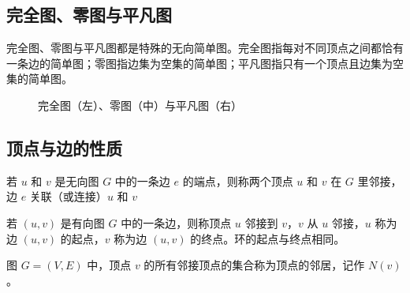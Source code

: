 \subsection{完全图、零图与平凡图}
完全图、零图与平凡图都是特殊的无向简单图。完全图指每对不同顶点之间都恰有一条边的简单图；零图指边集为空集的简单图；平凡图指只有一个顶点且边集为空集的简单图。
\begin{figure}[H]
    \centering
    \hspace{3em}
    \hspace{3em}
    \caption{完全图（左）、零图（中）与平凡图（右）}
    \label{完全图、零图与平凡图}
\end{figure}

\subsection{顶点与边的性质}
\begin{definition}[无向图顶点的邻接]\label{def:无向图邻接}
    若 $u$ 和 $v$ 是无向图 $G$ 中的一条边 $e$ 的端点，则称两个顶点 $u$ 和 $v$ 在 $G$ 里邻接，边 $e$ 关联（或连接）$u$ 和 $v$
\end{definition}
\begin{definition}[有向图顶点的邻接]\label{def:有向图邻接}
    若 $(u,v)$ 是有向图 $G$ 中的一条边，则称顶点 $u$ 邻接到 $v$，$v$ 从 $u$ 邻接，$u$ 称为边 $(u,v)$ 的起点，$v$ 称为边 $(u,v)$ 的终点。环的起点与终点相同。
\end{definition}
\begin{definition}[顶点的邻居]\label{def:邻居}
    图 $G=(V, E)$ 中，顶点 $v$ 的所有邻接顶点的集合称为顶点的邻居，记作 $N(v)$。
\end{definition}

